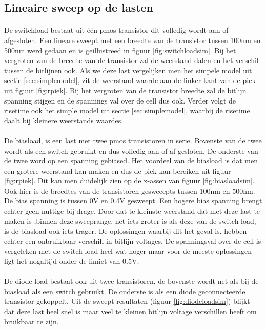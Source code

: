 \subsection{Lineaire sweep op de lasten}\label{sec:linload}
\paragraph{}
De switchload bestaat uit \'{e}\'{e}n pmos transistor dit volledig wordt aan of afgesloten. Een lineare sweept met een breedte van de transistor tussen 100nm en 500nm werd gedaan en is geillustreed in figuur \ref{fig:switchloadsim}. Bij het vergroten van de breedte van de transistor zal de weerstand dalen en het verschil tussen de bitlijnen ook. Als we deze last vergelijken men het simpele model uit sectie \ref{sec:simplemodel}, zit de weerstand waarde aan de linker kant van de piek uit figuur \ref{fig:rpiek}. Bij het vergroten van de transistor breedte zal de bitlijn spanning stijgen en de spannings val over de cell dus ook. Verder volgt de risetime ook het simple model uit sectie \ref{sec:simplemodel}, waarbij de risetime daalt bij kleinere weerstands waardes.

\paragraph{}
De biasload, is een last met twee pmos transistoren in serie. Bovenste van de twee wordt als een switch gebruikt en dus volledig aan of af gesloten. De onderste van de twee word op een spanning gebiased. Het voordeel van de biasload is dat men een grotere weerstand kan maken en dus de piek kan bereiken uit figuur \ref{fig:rpiek}. Dit kan men duidelijk zien op de x-assen van figuur \ref{fig:biasloadsim}. Ook hier is de breedtes van de transistoren gesweeepts tussen 100nm en 500nm. De bias spanning is tussen 0V en 0.4V gesweept. Een hogere bias spanning brengt echter geen nuttige bij drage. Door dat te kleinste weerstand dat met deze last te maken is ,binnen deze sweeprange, net iets groter is als deze van de switch load, is de biasload ook iets trager. De oplossingen waarbij dit het geval is, hebben echter een onbruikbaar verschill in bitlijn voltages. De spanningsval over de cell is vergeleken met de switch load heel wat hoger maar voor de meeste oplossingen ligt het nogaltijd onder de limiet van 0.5V.

\paragraph{}
De diode load bestaat ook uit twee transistoren, de bovenste wordt net als bij de biasload als een switch gebruikt. De onderste is als een diode geconnecteerde transistor gekoppelt. Uit de sweept resultaten (figuur \ref{fig:diodeloadsim}) blijkt dat deze last heel snel is maar veel te kleinen bitlijn voltage verschillen heeft om bruikbaar te zijn.

